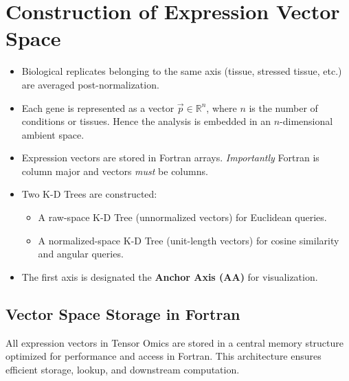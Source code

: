 \section{Construction of Expression Vector Space}\label{sec:vecspace}
    \begin{itemize}
        \item Biological replicates belonging to the same axis (tissue, stressed tissue, etc.) are averaged post-normalization.
        \item Each gene is represented as a vector \( \vec{p} \in \mathbb{R}^n \),
              where \( n \) is the number of conditions or tissues.
              Hence the analysis is embedded in an $n$-dimensional ambient space.
        \item Expression vectors are stored in Fortran arrays. \emph{Importantly}
              Fortran is column major and vectors \emph{must} be columns.
        \item Two K-D Trees are constructed:
              \begin{itemize}
                  \item A raw-space K-D Tree (unnormalized vectors) for Euclidean queries.
                  \item A normalized-space K-D Tree (unit-length vectors) for cosine similarity and angular queries.
              \end{itemize}
        \item The first axis is designated the \textbf{Anchor Axis (AA)} for
              visualization.
    \end{itemize}

    \subsection{Vector Space Storage in Fortran}\label{sec:vecstore}

        All expression vectors in Tensor Omics are stored in a central memory structure optimized for performance and access in Fortran. This architecture ensures efficient storage, lookup, and downstream computation.

